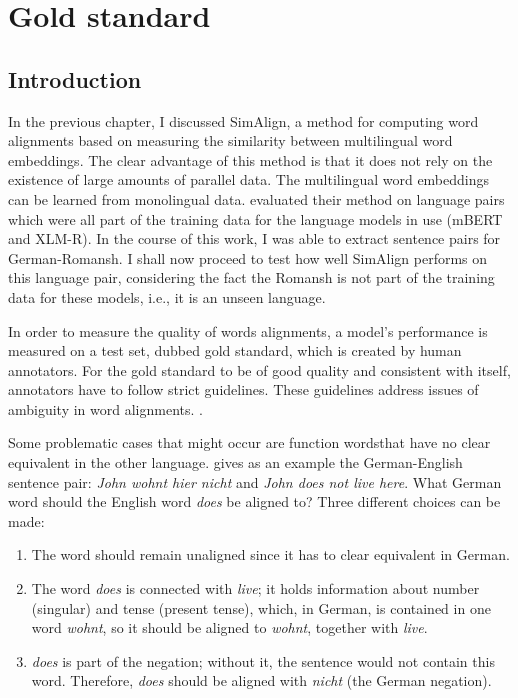 \chapter{Gold standard}
\label{chap:gold-standard}
\section{Introduction}
In the previous chapter, I discussed SimAlign, a method for computing word alignments based on measuring the similarity between multilingual word embeddings. 
The clear advantage of this method is that it does not rely on the existence of large amounts of parallel data. 
The multilingual word embeddings can be learned from monolingual data. 
\cite{jalili-sabet-etal-2020-simalign} evaluated their method on language pairs which were all part of the training data for the language models in use (mBERT and XLM-R). 
In the course of this work, I was able to extract  sentence pairs for German-Romansh. 
I shall now proceed to test how well SimAlign performs on this language pair, considering the fact the Romansh is not part of  the training data for these models, i.e., it is an unseen language. 


In order to measure the quality of words alignments, a model's performance is measured on a test set, dubbed  gold standard, which is created by human annotators. 
For the gold standard to be of good quality and consistent with itself, annotators have to follow strict guidelines.
These guidelines address issues of ambiguity in word alignments. \autocite[115]{koehn2009}. 

Some problematic cases that might occur are function words\footnotemark that have no clear equivalent in the other language.
\cite{koehn2009} gives as an example the German-English sentence pair: \emph{John wohnt hier nicht}  and \emph{John does not live here}. 
What German word should the English word \emph{does} be aligned to? 
Three different choices can be made:
\begin{enumerate}
	\item The word should remain unaligned since it has to clear equivalent in German.
	\item The word \emph{does} is connected with \emph{live}; it holds information about number (singular) and tense (present tense), which, in German, is contained in one word \emph{wohnt}, so it should be aligned to \emph{wohnt}, together with \emph{live}.
	\item \emph{does} is part of the negation; without it, the sentence would not contain this word. Therefore, \emph{does} should be aligned with \emph{nicht} (the German negation).
\end{enumerate}

